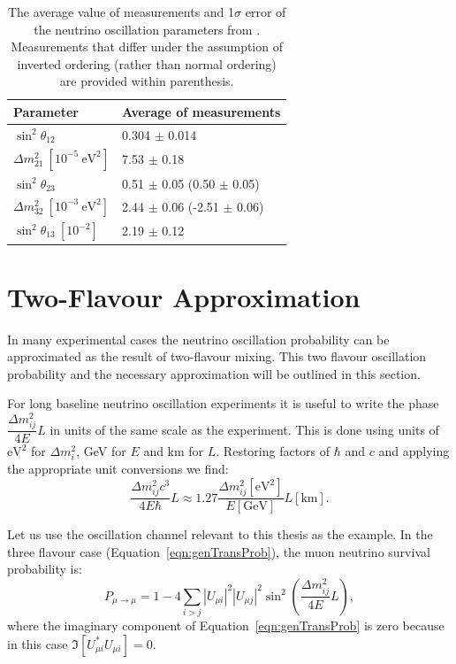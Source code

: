 \begin{table}
  \centering
  \begin{tabular}{ l | l  }
    \hline
    Parameter & Average of measurements \\ \hline
    $\sin^2 \theta_{12}$  & 0.304 $\pm$ 0.014 \\
    $\Delta m^2_{21} ~[10^{-5}~\text{eV}^2]$  & 7.53 $\pm$ 0.18 \\
    $\sin^2\theta_{23}$   & 0.51 $\pm$ 0.05 (0.50 $\pm$ 0.05)  \\
    $\Delta m^2_{32} ~[10^{-3}~\text{eV}^2]$ & 2.44 $\pm$ 0.06 (-2.51 $\pm$ 0.06)\\
    $\sin^2\theta_{13} ~[10^{-2}]$ & 2.19 $\pm$ 0.12 \\
    \hline
  \end{tabular}
  \caption{
    The average value of measurements and 1$\sigma$ error of
    the neutrino oscillation parameters from
  \cite{pdg}. Measurements that differ under the assumption of
  inverted ordering (rather than normal ordering) are provided
  within parenthesis.} 
  \label{tab:paremeterValues}
\end{table}



\section{Two-Flavour Approximation}

In many experimental cases the neutrino oscillation probability can be
approximated as the result of two-flavour mixing. This two flavour
oscillation probability and the necessary approximation will be
outlined in this section.

For long baseline neutrino oscillation experiments it is useful to
write the phase $\dfrac{\Delta m^2_{ij}}{4E} L$ in units of the same
scale as the experiment. This is done using units of $\text{eV}^2$ for
$\Delta m^2_{i}$, GeV for $E$ and km for $L$. Restoring factors of
$\hbar$ and $c$ and applying the appropriate unit conversions we find: 
\begin{equation}
\dfrac{\Delta m^2_{ij}c^3}{4E\hbar} L \approx 1.27 \dfrac{\Delta
  m^2_{ij} [\text{eV}^2]}{E [\text{GeV}]} L [\text{km}].
\end{equation}

Let us use the oscillation channel relevant to this thesis as the
example. In the three flavour case (Equation~\ref{eqn:genTransProb}),
the muon neutrino survival probability is:
\begin{equation}
P_{\mu \rightarrow \mu} = 1
- 4 \sum_{i>j}
|U_{\mu i}|^2 |U_{\mu j}|^2 
\sin^2\left(\dfrac{\Delta m^2_{ij}}{4E} L\right),
\end{equation}
\noindent where the imaginary component of
Equation~\ref{eqn:genTransProb} is zero because in this case 
$\mathfrak{I}[U^*_{\mu i} U_{\mu i}] = 0$.

